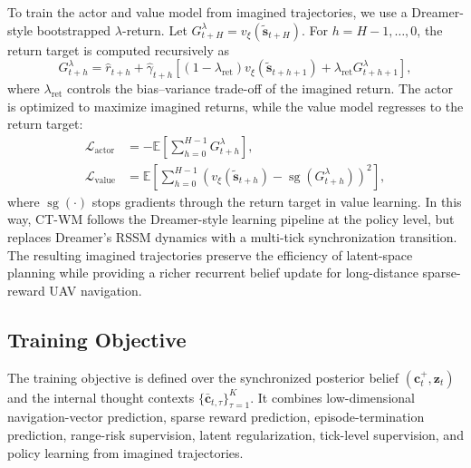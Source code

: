 \documentclass{article}
\begin{document}
To train the actor and value model from imagined trajectories, we use a Dreamer-style bootstrapped $\lambda$-return. Let $G^{\lambda}_{t+H}=v_{\xi}(\tilde{\mathbf s}_{t+H})$. For $h=H-1,\ldots,0$, the return target is computed recursively as
\begin{equation}
G^{\lambda}_{t+h}
=
\hat r_{t+h}
+
\hat \gamma_{t+h}
\left[
(1-\lambda_{\mathrm{ret}})
v_{\xi}(\tilde{\mathbf s}_{t+h+1})
+
\lambda_{\mathrm{ret}}
G^{\lambda}_{t+h+1}
\right],
\label{eq:lambda_return}
\end{equation}
where $\lambda_{\mathrm{ret}}$ controls the bias--variance trade-off of the imagined return. The actor is optimized to maximize imagined returns, while the value model regresses to the return target:
\begin{align}
\mathcal L_{\mathrm{actor}}
&=
-
\mathbb E\!\left[
\sum_{h=0}^{H-1}
G^{\lambda}_{t+h}
\right],
\label{eq:actor_loss}\\
\mathcal L_{\mathrm{value}}
&=
\mathbb E\!\left[
\sum_{h=0}^{H-1}
\left(
v_{\xi}(\tilde{\mathbf s}_{t+h})
-
\operatorname{sg}(G^{\lambda}_{t+h})
\right)^2
\right],
\label{eq:value_loss}
\end{align}
where $\operatorname{sg}(\cdot)$ stops gradients through the return target in value learning. In this way, CT-WM follows the Dreamer-style learning pipeline at the policy level, but replaces Dreamer's RSSM dynamics with a multi-tick synchronization transition. The resulting imagined trajectories preserve the efficiency of latent-space planning while providing a richer recurrent belief update for long-distance sparse-reward UAV navigation.

\subsection{Training Objective}

The training objective is defined over the synchronized posterior belief $(\mathbf c_t^+,\mathbf z_t)$ and the internal thought contexts $\{\bar{\mathbf c}_{t,\tau}\}_{\tau=1}^{K}$. It combines low-dimensional navigation-vector prediction, sparse reward prediction, episode-termination prediction, range-risk supervision, latent regularization, tick-level supervision, and policy learning from imagined trajectories.
\end{document}
